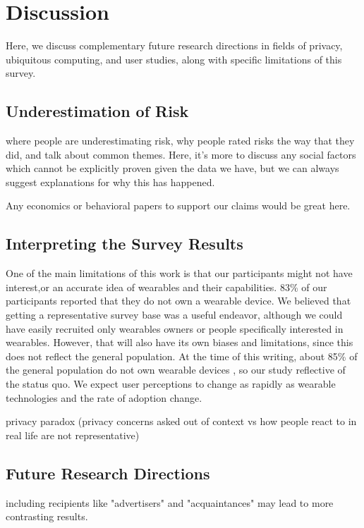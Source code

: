 \section{Discussion}
Here, we discuss complementary future research directions in fields of privacy, ubiquitous computing, and user studies, along with specific limitations of this survey.

\subsection{Underestimation of Risk} 
{\color{red} where people are underestimating risk, why people rated risks the way that they did, and talk about common themes. Here, it's more to discuss any social factors which cannot be explicitly proven given the data we have, but we can always suggest explanations for why this has happened. 

Any economics or behavioral papers to support our claims would be great here.}

\subsection{Interpreting the Survey Results}
One of the main limitations of this work is that our participants might not have interest,or an accurate idea of wearables and their capabilities. 83\% of our participants reported that they do not own a wearable device. We believed that getting a representative survey base was a useful endeavor, although we could have easily recruited only wearables owners or people specifically interested in wearables. However, that will also have its own biases and limitations, since this does not reflect the general population. At the time of this writing, about 85\% of the general population do not own wearable devices \cite{Nilsen,WearableStatNews}, so our study reflective of the status quo. We expect user perceptions to change as rapidly as wearable technologies and the rate of adoption change. 

{\color {red} privacy paradox (privacy concerns asked out of context vs how people react to in real life are not representative)}

\subsection{Future Research Directions}
{\color {red} including recipients like "advertisers" and "acquaintances" may lead to more contrasting results.}

